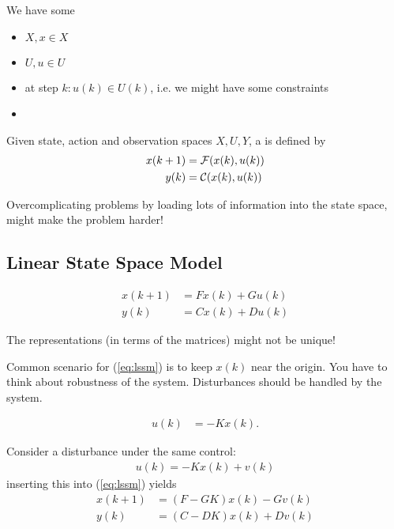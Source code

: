 We have some

\begin{itemize}
    \item {} \(X,x\in X\)
    \item {} \(U, u\in U\)
    \item {} at step \(k: u(k)\in U(k)\), i.e. we might have some constraints
    \item {}
\end{itemize}

\begin{definition}\label{def:1.1} 
    Given state, action and observation spaces \(X,U,Y\), a 
    is defined by
    \begin{align}\label{eq:1}
        x(k+1)&=\mathcal{F}(x(k),u(k))\\
        y(k)&=\mathcal{C}(x(k),u(k))  
    \end{align}
\end{definition}

\begin{remark}
    Overcomplicating problems by loading lots of information into the state space, might make the problem harder!
\end{remark}

\subsection{Linear State Space Model}

\begin{align}\label{eq:lssm}
    x(k+1)&=Fx(k)+Gu(k)\\
    y(k)&=Cx(k)+Du(k)
\end{align}

\begin{remark}
    The representations (in terms of the matrices) might not be unique!
\end{remark}

Common scenario for (\ref{eq:lssm}) is to keep \(x(k)\) near the origin. You have to think about robustness of the system. 
Disturbances should be handled by the system. 

\begin{align*}
    u(k)&=-Kx(k).
\end{align*}

Consider a disturbance under the same control:
\begin{align*}
    u(k)=-Kx(k)+v(k)
\end{align*} 
inserting this into (\ref{eq:lssm}) yields
\begin{align*}
    x(k+1) &= (F-GK)x(k)-Gv(k)\\
    y(k) &= (C-DK)x(k)+Dv(k)
\end{align*}

